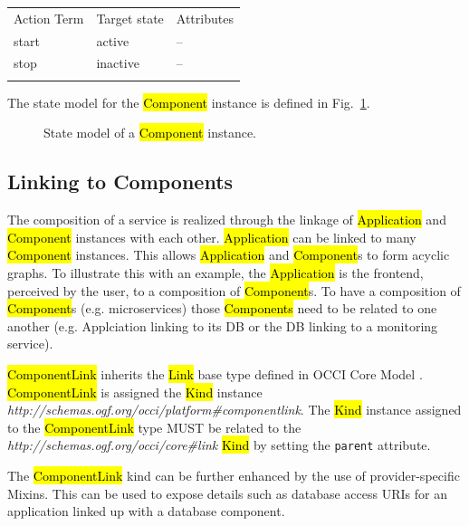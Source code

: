 \documentclass[10pt,a4paper]{article}
\begin{document}
{
	\begin{tabular}{lll}
	\toprule
	Action Term & Target state & Attributes \\
	\colrule
	start & active & -- \\
	stop & inactive & -- \\
	\botrule
	\end{tabular}
}

The state model for the \hl{Component} instance is defined in Fig.~\ref{fig:component_state}.

\begin{figure}[!h]
	{\centering {} \par}
	\caption{State model of a \hl{Component} instance.}
	\label{fig:component_state}
\end{figure}

\subsection{Linking to Components}

The composition of a service is realized through the linkage 
of \hl{Application} and \hl{Component} instances with each 
other. \hl{Application} can be linked to many \hl{Component} 
instances. This allows \hl{Application} and \hl{Component}s 
to form acyclic graphs. To illustrate this with an example, the 
\hl{Application} is the frontend, perceived by the user, to a 
composition of \hl{Component}s. To have a composition 
of \hl{Component}s (e.g. microservices) those \hl{Components} 
need to be related to one another (e.g. Applciation linking to 
its DB or the DB linking to a monitoring service). 

\hl{ComponentLink} inherits the \hl{Link} base type defined in OCCI Core Model \cite{occi:core}. \hl{ComponentLink} is assigned the \hl{Kind} instance \textit{http://schemas.ogf.org/occi/platform\#componentlink}. The \hl{Kind} instance assigned to the \hl{ComponentLink} type MUST be related to the \textit{http://schemas.ogf.org/occi/core\#link} \hl{Kind} by setting the \texttt{parent} attribute.

The \hl{ComponentLink} kind can be further enhanced by the use of  provider-specific Mixins. This can be used to expose details such as database access URIs for an application linked up with a database component.
\end{document}
